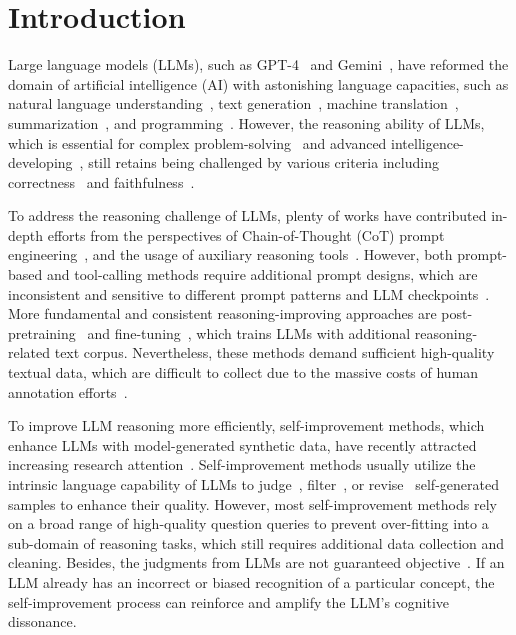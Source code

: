 \documentclass{article}
\theoremstyle{plain}
\theoremstyle{definition}
\theoremstyle{remark}
\begin{document}
\vspace{-1mm}
\section{Introduction}
\vspace{-1.5mm}
Large language models (LLMs), such as GPT-4~\citep{openai2022gpt4} and Gemini~\citep{team2023gemini}, have reformed the domain of artificial intelligence (AI) with astonishing language capacities, such as natural language understanding~\citep{yang2023harnessing,touvron2023llama}, text generation~\citep{kocon2023chatgpt,anil2023palm}, machine translation~\citep{jiao2023chatgpt}, summarization~\citep{xie-etal-2024-chunk}, and programming~\citep{surameery2023use,tian2023chatgpt}. However, the reasoning ability of LLMs, which is essential for complex problem-solving~\citep{pan2023logic} and advanced intelligence-developing~\citep{yao2021adversarial}, still retains being challenged by various criteria including correctness~\citep{zhang2023language} and faithfulness~\citep{turpin2024language}. 

To address the reasoning challenge of LLMs, plenty of works have contributed in-depth efforts from the perspectives of Chain-of-Thought (CoT) prompt engineering~\citep{wei2022chain,ding2023everything,yao2024tree}, and the usage of auxiliary reasoning tools~\citep{pan2023logic}. However, both prompt-based and tool-calling methods require additional prompt designs, which are inconsistent and sensitive to different prompt patterns and LLM checkpoints~\citep{turpin2024language,chu2023survey}. More fundamental and consistent reasoning-improving approaches are post-pretraining~\citep{azerbayev2023llemma} and fine-tuning~\citep{dong2023abilities}, which trains LLMs with additional reasoning-related text corpus.
%
Nevertheless, these methods demand sufficient high-quality textual data, which are difficult to collect due to the massive costs of human annotation efforts~\citep{singh2023beyond}. 

To improve LLM reasoning more efficiently, self-improvement methods, which enhance LLMs with model-generated synthetic data, have recently attracted increasing research attention~\citep{singh2023beyond,huang2023large,burns2023weak,chen2024self}. Self-improvement methods usually utilize the intrinsic language capability of LLMs to judge~\citep{huang2023large}, filter~\citep{yuan2024self}, or revise~\citep{yuan2024self} self-generated samples to enhance their quality. However, most self-improvement methods rely on a broad range of high-quality question queries to prevent over-fitting into a sub-domain of reasoning tasks, which still requires additional data collection and cleaning. Besides, the judgments from LLMs are not guaranteed objective~\citep{raina2024llm}. If an LLM already has an incorrect or biased recognition of a particular concept, the self-improvement process can reinforce and amplify the LLM's cognitive dissonance.
\end{document}
